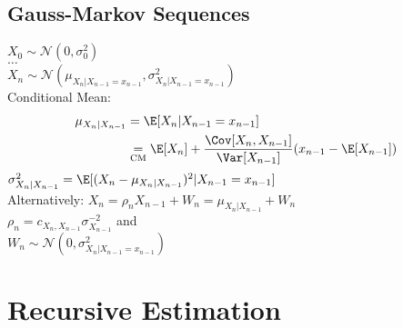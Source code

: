 \documentclass[english]{latex4ei/latex4ei_sheet}
\begin{document}
\begin{sectionbox}
	\subsection{Gauss-Markov Sequences}
	$X_{0}  \sim \mathcal{N}\left(0, \sigma_{0}^{2}\right)$ \\
	$\ldots$  \\
	$X_{n}  \sim \mathcal{N}\left(\mu_{X_{n} | X_{n-1}=x_{n-1}}, \sigma_{X_{n} | X_{n-1}=x_{n-1}}^{2}\right)$\\
	Conditional Mean:\\ 
	\begin{align}
		\nonumber
		\mu_{X_n|X_{n-1}} &= \E[X_n|X_{n-1}=x_{n-1}] \\
		\nonumber
		&\underset{\mathrm{CM}}= \E[X_n] + \frac{\Cov[X_n,X_{n-1}]}{\Var[X_{n-1}]}(x_{n-1} - \E[X_{n-1}])
	\end{align}
	$\sigma^2_{X_n|X_{n-1}} = \E[(X_n - \mu_{X_n|X_{n-1}})^2|X_{n-1}=x_{n-1}]$\\
	
	Alternatively: $X_{n}=\rho_{n} X_{n-1}+W_{n} = \mu_{X_n|X_{n-1}} + W_n$\\
	$\rho_{n}=c_{X_{n}, X_{n-1}} \sigma_{X_{n-1}}^{-2}$ and\\
	$W_{n} \sim \mathcal{N}\left(0, \sigma_{X_{n} | X_{n-1}=x_{n-1}}^{2}\right)$
\end{sectionbox}


\section{Recursive Estimation}
\end{document}
